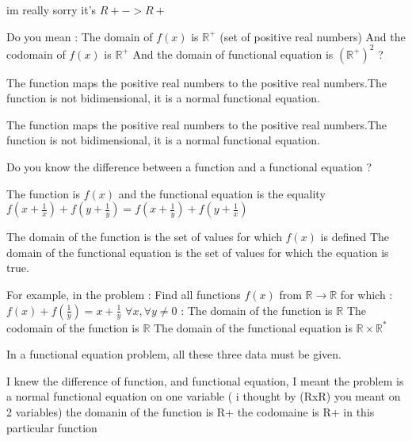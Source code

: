 \begin{solution}
	\begin{tcolorbox}im really sorry it's $R+->R+$\end{tcolorbox}
Do you mean :
The domain of $f(x)$ is $\mathbb R^+$ (set of positive real numbers)
And the codomain of $f(x)$ is $\mathbb R^+$
And the domain of functional equation is $(\mathbb R^+)^2$
?
\end{solution}



\begin{solution}
	The function maps the positive real numbers to the positive real numbers.The function is not bidimensional, it is a normal functional equation.
\end{solution}



\begin{solution}
	\begin{tcolorbox}The function maps the positive real numbers to the positive real numbers.The function is not bidimensional, it is a normal functional equation.\end{tcolorbox}
Do you know the difference between a function and a functional equation ?

The function is $f(x)$ and the functional equation is the equality $f(x+\frac 1x)+f(y+\frac 1y)=f(x+\frac 1y)+f(y+\frac 1x)$

The domain of the function is the set of values for which $f(x)$ is defined
The domain of the functional equation is the set of values for which the equation is true.


For example, in the problem :
Find all functions $f(x)$ from $\mathbb R\to\mathbb R$ for which :
$f(x)+f(\frac 1y)=x+\frac 1y$ $\forall x,\forall y\ne 0$ :
The domain of the function is $\mathbb R$
The codomain of the function is $\mathbb R$
The domain of the functional equation is $\mathbb R\times\mathbb R^*$

In a functional equation problem, all these three data must be given.
\end{solution}



\begin{solution}
	I knew the difference of function, and functional equation, I meant the problem is a normal functional equation on one variable ( i thought by (RxR) you meant on 2 variables)
the domanin of the function is R+
the codomaine is R+ in this particular function
\end{solution}



